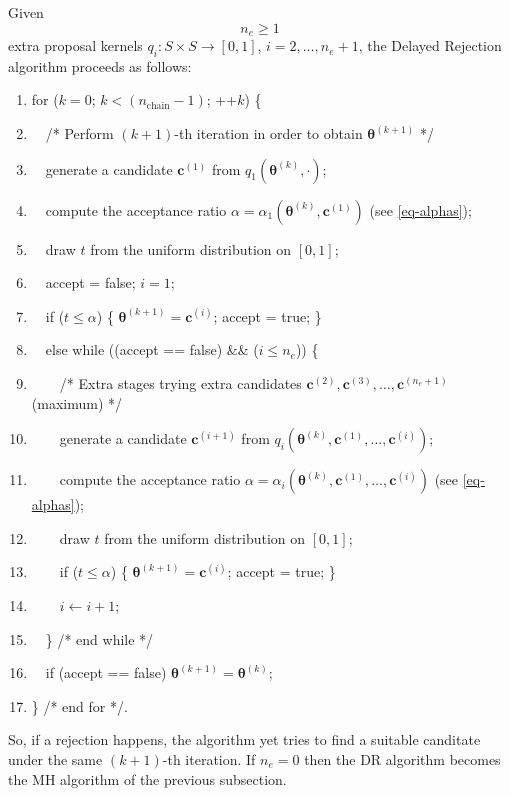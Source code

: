 Given
\begin{equation}\label{eq-ne}
n_e\geqslant 1
\end{equation}
extra proposal kernels $q_i:S\times S\rightarrow [0,1]$, $i=2,\ldots,n_e+1$,
the Delayed Rejection algorithm proceeds as follows:
\begin{enumerate}
\item for ($k=0$; $k < (n_{\text{chain}}-1)$; ++$k$) \{
\item $\quad$/* Perform $(k+1)$-th iteration in order to obtain $\boldsymbol{\theta}^{(k+1)}$ */
\item $\quad$generate a candidate $\mathbf{c}^{(1)}$ from $q_1(\boldsymbol{\theta}^{(k)},\cdot)$;
\item $\quad$compute the acceptance ratio $\alpha=\alpha_1(\boldsymbol{\theta}^{(k)},\mathbf{c}^{(1)})$ (see \eqref{eq-alphas});
\item $\quad$draw $t$ from the uniform distribution on $[0,1]$;
\item $\quad$accept = false; $i=1$;
\item $\quad$if ($t\leqslant \alpha$) \{ $\boldsymbol{\theta}^{(k+1)}=\mathbf{c}^{(i)}$; accept = true; \}
\item $\quad$else while ((accept == false) \&\& ($i\leqslant n_e$)) \{
\item $\quad\quad$/* Extra stages trying extra candidates $\mathbf{c}^{(2)},\mathbf{c}^{(3)},\ldots,\mathbf{c}^{(n_e+1)}$ (maximum) */
\item $\quad\quad$generate a candidate $\mathbf{c}^{(i+1)}$ from $q_i(\boldsymbol{\theta}^{(k)},\mathbf{c}^{(1)},\ldots,\mathbf{c}^{(i)})$;
\item $\quad\quad$compute the acceptance ratio $\alpha=\alpha_i(\boldsymbol{\theta}^{(k)},\mathbf{c}^{(1)},\ldots,\mathbf{c}^{(i)})$ (see \eqref{eq-alphas});
\item $\quad\quad$draw $t$ from the uniform distribution on $[0,1]$;
\item $\quad\quad$if ($t\leqslant \alpha$) \{ $\boldsymbol{\theta}^{(k+1)}=\mathbf{c}^{(i)}$; accept = true; \}
\item $\quad\quad$$i\leftarrow i+1$;
\item $\quad$\} /* end while */
\item $\quad$if (accept == false) $\boldsymbol{\theta}^{(k+1)}=\boldsymbol{\theta}^{(k)}$;
\item \} /* end for */.
\end{enumerate}
So, if a rejection happens, the algorithm yet tries to find a suitable canditate under the same $(k+1)$-th iteration.
If $n_e=0$ then the DR algorithm becomes the MH algorithm of the previous subsection.

